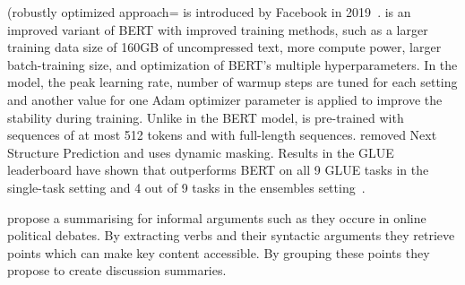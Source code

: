 \Roberta (robustly optimized \Bert approach= is introduced by Facebook in 2019~\cite{LiuOGDJCLLZS2019}. 
\Roberta is an improved variant of BERT with improved training methods, such as a larger training data size of 160GB of uncompressed text, more compute power, larger batch-training size, and optimization of BERT’s multiple hyperparameters. 
In the \Roberta model, the peak learning rate, number of warmup steps are tuned for each setting and another value for one Adam optimizer parameter is applied to improve the stability during training. 
Unlike in the BERT model, \Roberta is pre-trained with sequences of at most 512 tokens and with full-length sequences. 
\Roberta removed Next Structure Prediction and uses dynamic masking. 
Results in the GLUE leaderboard have shown that \Roberta outperforms BERT on all 9 GLUE tasks in the single-task setting and 4 out of 9 tasks in the ensembles setting~\cite{WangSMHLB2018,LiuOGDJCLLZS2019}.

\citet{egan2016summarising} propose a summarising for informal arguments such as they
occure in online political debates. By extracting verbs and their syntactic arguments they retrieve points which can make key content accessible. By grouping these points they propose to create discussion summaries.





